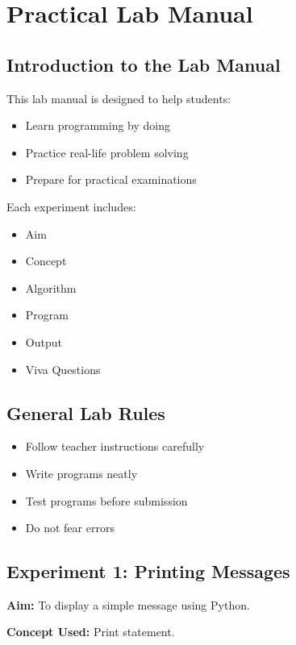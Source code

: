 
\chapter*{Practical Lab Manual}

\section*{Introduction to the Lab Manual}

This lab manual is designed to help students:
\begin{itemize}
    \item Learn programming by doing
    \item Practice real-life problem solving
    \item Prepare for practical examinations
\end{itemize}

Each experiment includes:
\begin{itemize}
    \item Aim
    \item Concept
    \item Algorithm
    \item Program
    \item Output
    \item Viva Questions
\end{itemize}

\section*{General Lab Rules}

\begin{itemize}
    \item Follow teacher instructions carefully
    \item Write programs neatly
    \item Test programs before submission
    \item Do not fear errors
\end{itemize}

\newpage
\section*{Experiment 1: Printing Messages}

\textbf{Aim:}  
To display a simple message using Python.

\textbf{Concept Used:}  
Print statement.

